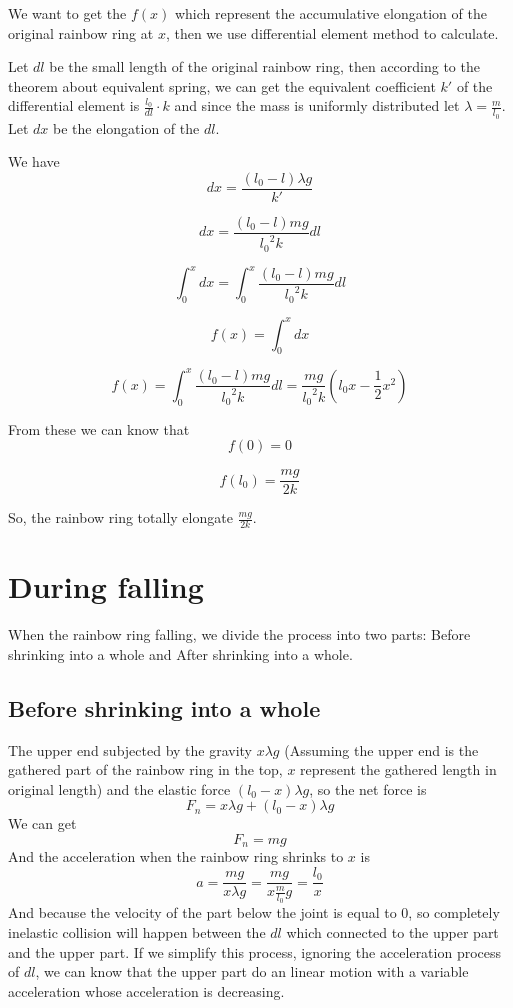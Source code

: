 \documentclass[12pt]{article}
\begin{document}
We want to get the $f(x)$ which represent the accumulative elongation of the original rainbow ring at $x$, then we use differential element method to calculate.

Let $dl$ be the small length of the original rainbow ring, then according to the theorem about equivalent spring, we can get the equivalent coefficient $k'$ of the differential element is $\frac{l_0}{dl}\cdot k$ and since the mass is uniformly distributed let $\lambda = \frac{m}{l_0}$. Let $dx$ be the elongation of the $dl$.

We have
\[ dx = \frac{\left(l_0 - l\right)\lambda g}{k'}\]

\[dx = \frac{\left(l_0 - l\right)mg}{{l_0}^2k}dl\]

\[\int_{0}^{x} dx = \int_{0}^{x} \frac{\left(l_0 - l\right)mg}{{l_0}^2k}dl\]

\[f\left(x\right) = \int_{0}^{x} dx\]

\[f\left(x\right) = \int_{0}^{x} \frac{\left(l_0 - l\right)mg}{{l_0}^2k}dl = \frac{mg}{{l_0}^2k}\left(l_0x - \frac{1}{2}x^2\right)\]

From these we can know that
\[f(0) = 0\]

\[f(l_0) =\frac{mg}{2k}\]

So, the rainbow ring totally elongate $\frac{mg}{2k}$.


\section*{During falling}
\label{sec:Dur}
When the rainbow ring falling, we divide the process into two parts: Before shrinking into a whole and After shrinking into a whole.
\subsection*{Before shrinking into a whole}
The upper end subjected by the gravity $x\lambda g$ (Assuming the upper end is the gathered part of the rainbow ring in the top, $x$ represent the gathered length in original length) and the elastic force $\left(l_0 - x\right)\lambda g$, 
so the net force is $$F_n = x\lambda g + \left(l_0 - x\right)\lambda g$$
We can get\[ F_n = mg\]
And the acceleration when the rainbow ring shrinks to $x$ is
\[ a = \frac{mg}{x\lambda g} = \frac{mg}{x\frac{m}{l_0}g} = \frac{l_0}{x}\]
And because the velocity of the part below the joint is equal to 0, so completely inelastic collision will happen between the $dl$ which connected to the upper part and the upper part. If we simplify this process, ignoring the acceleration process of $dl$, we can know that the upper part do an linear motion with a variable acceleration whose acceleration is decreasing.
\end{document}
